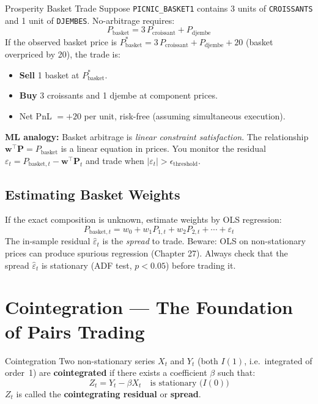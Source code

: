 \documentclass[12pt,a4paper,openany]{report}
\theoremstyle{definition}
\begin{document}
\begin{examplebox}{Prosperity Basket Trade}
Suppose \texttt{PICNIC\_BASKET1} contains 3 units of \texttt{CROISSANTS} and 1 unit of \texttt{DJEMBES}. No-arbitrage requires:
\[
  P_{\text{basket}} = 3\,P_{\text{croissant}} + P_{\text{djembe}}
\]
If the observed basket price is $P_{\text{basket}}^* = 3\,P_{\text{croissant}} + P_{\text{djembe}} + 20$ (basket overpriced by 20), the trade is:
\begin{itemize}
  \item \textbf{Sell} 1 basket at $P_{\text{basket}}^*$.
  \item \textbf{Buy} 3 croissants and 1 djembe at component prices.
  \item Net PnL $= +20$ per unit, risk-free (assuming simultaneous execution).
\end{itemize}
\end{examplebox}

\textbf{ML analogy:} Basket arbitrage is \emph{linear constraint satisfaction}. The relationship $\mathbf{w}^{\top}\mathbf{P} = P_{\text{basket}}$ is a linear equation in prices. You monitor the residual $\varepsilon_t = P_{\text{basket},t} - \mathbf{w}^{\top}\mathbf{P}_t$ and trade when $|\varepsilon_t| > \epsilon_{\text{threshold}}$.

\subsection{Estimating Basket Weights}

If the exact composition is unknown, estimate weights by OLS regression:
\[
  P_{\text{basket},t} = w_0 + w_1 P_{1,t} + w_2 P_{2,t} + \cdots + \varepsilon_t
\]
The in-sample residual $\hat{\varepsilon}_t$ is the \emph{spread} to trade. Beware: OLS on non-stationary prices can produce spurious regression (Chapter 27). Always check that the spread $\hat{\varepsilon}_t$ is stationary (ADF test, $p < 0.05$) before trading it.

\section{Cointegration — The Foundation of Pairs Trading}

\begin{definitionbox}{Cointegration}
Two non-stationary series $X_t$ and $Y_t$ (both $I(1)$, i.e.\ integrated of order~1) are \textbf{cointegrated} if there exists a coefficient $\beta$ such that:
\[
  Z_t = Y_t - \beta X_t \quad \text{is stationary (}I(0)\text{)}
\]
$Z_t$ is called the \textbf{cointegrating residual} or \textbf{spread}.
\end{definitionbox}
\end{document}
